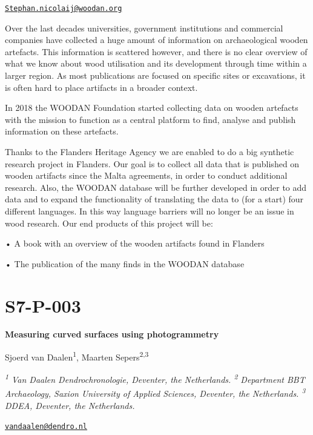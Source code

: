 \documentclass[
]{book}
\begin{document}
\href{mailto:Stephan.nicolaij@woodan.org}{\nolinkurl{Stephan.nicolaij@woodan.org}}

Over the last decades universities, government institutions and commercial companies have collected a huge amount of information on archaeological wooden artefacts. This information is scattered however, and there is no clear overview of what we know about wood utilisation and its development through time within a larger region. As most publications are focused on specific sites or excavations, it is often hard to place artifacts in a broader context.

In 2018 the WOODAN Foundation started collecting data on wooden artefacts with the mission to function as a central platform to find, analyse and publish information on these artefacts.

Thanks to the Flanders Heritage Agency we are enabled to do a big synthetic research project in Flanders. Our goal is to collect all data that is published on wooden artifacts since the Malta agreements, in order to conduct additional research. Also, the WOODAN database will be further developed in order to add data and to expand the functionality of translating the data to (for a start) four different languages. In this way language barriers will no longer be an issue in wood research. Our end products of this project will be:

• A book with an overview of the wooden artifacts found in Flanders

• The publication of the many finds in the WOODAN database

\hypertarget{s7-p-003}{%
\section*{S7-P-003}\label{s7-p-003}}

\textbf{Measuring curved surfaces using photogrammetry}

Sjoerd van Daalen\textsuperscript{1}, Maarten Sepers\textsuperscript{2,3}

\emph{\textsuperscript{1} Van Daalen Dendrochronologie, Deventer, the Netherlands. \textsuperscript{2} Department BBT Archaeology, Saxion University of Applied Sciences, Deventer, the Netherlands. \textsuperscript{3} DDEA, Deventer, the Netherlands.}

\href{mailto:vandaalen@dendro.nl}{\nolinkurl{vandaalen@dendro.nl}}
\end{document}

